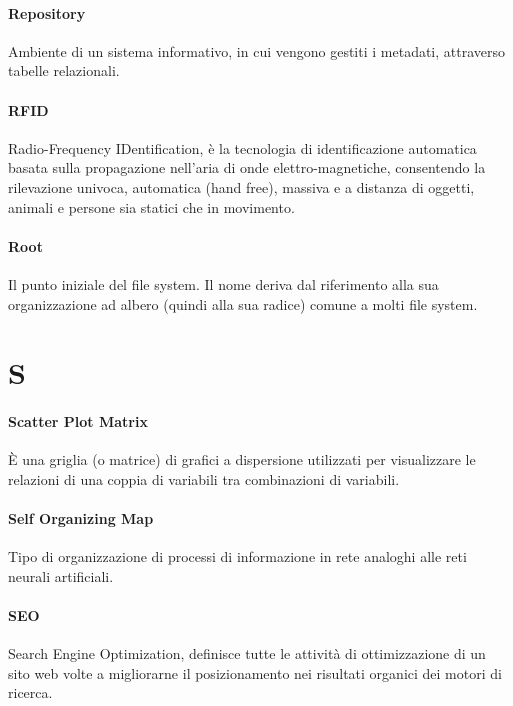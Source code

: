 \documentclass[]{article}
\begin{document}
	\paragraph*{Repository}
	Ambiente di un sistema informativo, in cui vengono gestiti i metadati, attraverso tabelle relazionali.

	\paragraph*{RFID}
	Radio-Frequency IDentification, è la tecnologia di identificazione automatica basata sulla propagazione nell'aria di onde elettro-magnetiche, consentendo la rilevazione univoca, automatica (hand free), massiva e a distanza di oggetti, animali e persone sia statici che in movimento.

	\paragraph*{Root}
	Il punto iniziale del file system. Il nome deriva dal riferimento alla sua organizzazione ad albero (quindi alla sua radice) comune a molti file system.

	\newpage

	\section*{S}

	\paragraph*{Scatter Plot Matrix}
	È una griglia (o matrice) di grafici a dispersione utilizzati per visualizzare le relazioni di una coppia di variabili tra combinazioni di variabili.

	\paragraph*{Self Organizing Map}
	Tipo di organizzazione di processi di informazione in rete analoghi alle reti neurali artificiali.

	\paragraph*{SEO}
	Search Engine Optimization, definisce tutte le attività di ottimizzazione di un sito web volte a migliorarne il posizionamento nei risultati organici dei motori di ricerca.
\end{document}
